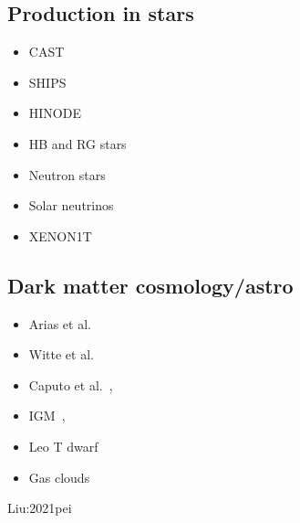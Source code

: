 \documentclass[9pt,twocolumn]{extarticle}
\begin{document}
\begin{mdframed}
\subsection*{Production in stars}\vspace{-0.5em}
\begin{itemize}\setlength\itemsep{-0.5em}
\item CAST~\cite{Redondo:2008aa}
\item SHIPS~\cite{Schwarz:2015lqa} 
\item HINODE~\cite{Frerick:2022mjg}
\item HB and RG stars~\cite{Redondo:2013lna}
\item Neutron stars~\cite{Hong:2020bxo}
\item Solar neutrinos~\cite{Vinyoles:2015aba}
\item XENON1T~\cite{XENON:2021myl}
\end{itemize}



\subsection*{Dark matter cosmology/astro}\vspace{-0.5em}
\begin{itemize}\setlength\itemsep{-0.5em}
\item  Arias et al.~\cite{Arias:2012az}
\item Witte et al.~\cite{McDermott:2019lch,Witte:2020rvb}
 \item  Caputo et al.~\cite{Caputo:2020rnx,Caputo:2020bdy}, 
 \item  IGM~\cite{Dubovsky:2015cca},
 \item  Leo T dwarf~\cite{Wadekar:2019xnf}
 \item  Gas clouds~\cite{Bhoonah:2019eyo}
\end{itemize}


Liu:2021pei

\end{mdframed}
\end{document}
